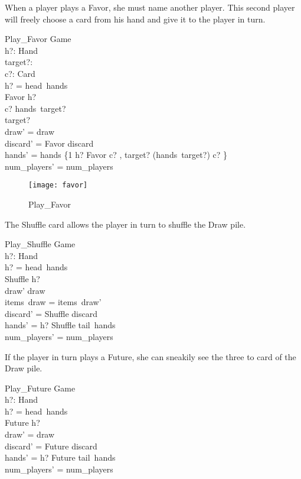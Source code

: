 \documentclass[11pt, fuzz]{article}
\begin{document}
When a player plays a Favor, she must name another player. This second player will freely choose a card from his hand and give it to the player in turn. 

\begin{schema}{Play\_Favor}
    \Delta Game \\
    h?: Hand \\
    target?: \nat \\
    c?: Card \\
\where
    h? = head~hands \\
    Favor \inbag h? \\
    c? \inbag hands~target? \\
    target?  \\
    draw' = draw \\
    discard' = \langle Favor \rangle \cat discard \\
    hands' = hands \oplus \{1 \mapsto h? \uminus \lbag Favor \rbag \uplus \lbag c? \rbag, target? \mapsto (hands~target?) \uminus \lbag c? \rbag\} \\
    num\_players' = num\_players 
\end{schema}

\begin{figure}
    \centering
    \texttt{[image: favor]}
    \caption{Play\_Favor}
\end{figure}

The Shuffle card allows the player in turn to shuffle the Draw pile. 

\begin{schema}{Play\_Shuffle}
    \Delta Game \\
    h?: Hand \\
\where
    h? = head~hands \\
    Shuffle \inbag h? \\
    draw' \neq draw \\
    items~draw = items~draw' \\
    discard' = \langle Shuffle \rangle \cat discard \\
    hands' = \langle h? \uminus \lbag Shuffle \rbag \rangle \cat tail~hands \\
    num\_players' = num\_players
\end{schema}

If the player in turn plays a Future, she can sneakily see the three to card of the Draw pile. 

\begin{schema}{Play\_Future}
    \Delta Game \\
    h?: Hand \\
\where
    h? = head~hands \\
    Future \inbag h? \\
    draw' = draw \\
    discard' = \langle Future \rangle \cat discard \\
    hands' = \langle h? \uminus \lbag Future \rbag \rangle \cat tail~hands \\
    num\_players' = num\_players
\end{schema}
\end{document}
